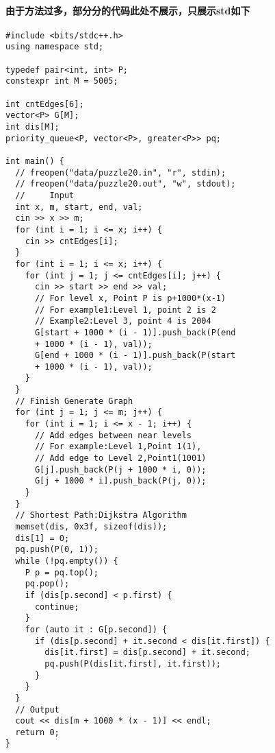 \documentclass[final,11pt,oneside,UTF8]{report}
\begin{document}
\paragraph{由于方法过多，部分分的代码此处不展示，只展示std如下}
{
    \mono\begin{lstlisting}
#include <bits/stdc++.h>
using namespace std;

typedef pair<int, int> P;
constexpr int M = 5005;

int cntEdges[6];
vector<P> G[M];
int dis[M];
priority_queue<P, vector<P>, greater<P>> pq;

int main() {
  // freopen("data/puzzle20.in", "r", stdin);
  // freopen("data/puzzle20.out", "w", stdout);
  //     Input
  int x, m, start, end, val;
  cin >> x >> m;
  for (int i = 1; i <= x; i++) {
    cin >> cntEdges[i];
  }
  for (int i = 1; i <= x; i++) {
    for (int j = 1; j <= cntEdges[i]; j++) {
      cin >> start >> end >> val;
      // For level x, Point P is p+1000*(x-1)
      // For example1:Level 1, point 2 is 2
      // Example2:Level 3, point 4 is 2004
      G[start + 1000 * (i - 1)].push_back(P(end 
      + 1000 * (i - 1), val));
      G[end + 1000 * (i - 1)].push_back(P(start 
      + 1000 * (i - 1), val));
    }
  }
  // Finish Generate Graph
  for (int j = 1; j <= m; j++) {
    for (int i = 1; i <= x - 1; i++) {
      // Add edges between near levels
      // For example:Level 1,Point 1(1),
      // Add edge to Level 2,Point1(1001)
      G[j].push_back(P(j + 1000 * i, 0));
      G[j + 1000 * i].push_back(P(j, 0));
    }
  }
  // Shortest Path:Dijkstra Algorithm
  memset(dis, 0x3f, sizeof(dis));
  dis[1] = 0;
  pq.push(P(0, 1));
  while (!pq.empty()) {
    P p = pq.top();
    pq.pop();
    if (dis[p.second] < p.first) {
      continue;
    }
    for (auto it : G[p.second]) {
      if (dis[p.second] + it.second < dis[it.first]) {
        dis[it.first] = dis[p.second] + it.second;
        pq.push(P(dis[it.first], it.first));
      }
    }
  }
  // Output
  cout << dis[m + 1000 * (x - 1)] << endl;
  return 0;
}
    \end{lstlisting}
}
\newpage
\end{document}
